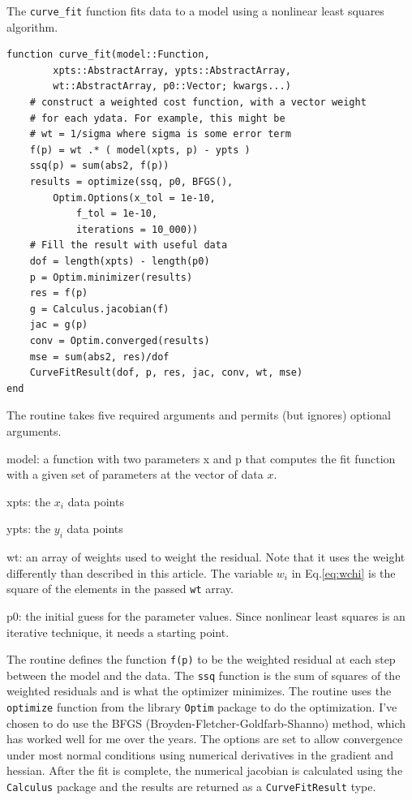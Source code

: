 \documentclass{scrartcl}
\begin{document}
The \texttt{curve\_fit} function fits data to a model
using a nonlinear least squares algorithm.
\begin{lstlisting}
function curve_fit(model::Function,
		xpts::AbstractArray, ypts::AbstractArray,
		wt::AbstractArray, p0::Vector; kwargs...)
    # construct a weighted cost function, with a vector weight
    # for each ydata. For example, this might be
    # wt = 1/sigma where sigma is some error term
    f(p) = wt .* ( model(xpts, p) - ypts )
    ssq(p) = sum(abs2, f(p))
    results = optimize(ssq, p0, BFGS(),
        Optim.Options(x_tol = 1e-10,
            f_tol = 1e-10,
            iterations = 10_000))
    # Fill the result with useful data
    dof = length(xpts) - length(p0)
    p = Optim.minimizer(results)
    res = f(p)
    g = Calculus.jacobian(f)
    jac = g(p)
    conv = Optim.converged(results)
    mse = sum(abs2, res)/dof
    CurveFitResult(dof, p, res, jac, conv, wt, mse)
end
\end{lstlisting}
The routine takes five required arguments and permits (but ignores)
optional arguments.
\begin{description}
\item{model:} a function with two parameters x and p
that computes the fit function with a given set of parameters
at the vector of data $x$.
\item{xpts:} the $x_i$ data points
\item{ypts:} the $y_i$ data points
\item{wt:} an array of weights used to weight the residual.
Note that it uses the weight differently than described in this
article. The variable $w_i$ in Eq.\ref{eq:wchi} is the square
of the elements in the passed \texttt{wt} array.
\item{p0:} the initial guess for the parameter values. Since
nonlinear least squares is an iterative technique, it needs
a starting point.
\end{description}
The routine defines the function \texttt{f(p)} to be the 
weighted residual at each step between the model and the data.
The \texttt{ssq} function is the sum of squares of the weighted
residuals and is what the optimizer minimizes. The routine
uses the \texttt{optimize} function from the library
\texttt{Optim} package to do the optimization. I've chosen to do
use the BFGS (Broyden-Fletcher-Goldfarb-Shanno) method, which
has worked well for me over the years. The options are set to
allow convergence under most normal conditions using numerical
derivatives in the gradient and hessian. After the fit is
complete, the numerical jacobian is calculated using the
\texttt{Calculus} package and the results are returned
as a \texttt{CurveFitResult} type.
\end{document}
